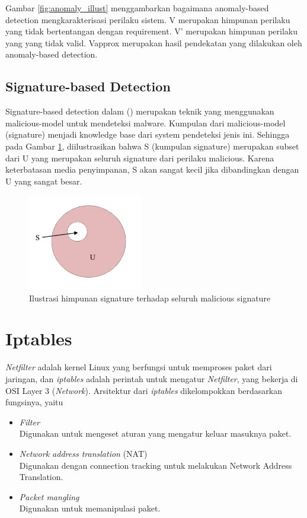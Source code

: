 Gambar \ref{fig:anomaly_illust} menggambarkan bagaimana anomaly-based detection mengkarakterisasi perilaku sistem. V merupakan himpunan perilaku yang tidak bertentangan dengan requirement. V’ merupakan himpunan perilaku yang yang tidak valid. Vapprox merupakan hasil pendekatan yang dilakukan oleh anomaly-based detection.

\subsection{Signature-based Detection}
Signature-based detection dalam (\cite{idika2007survey}) merupakan teknik yang menggunakan malicious-model untuk mendeteksi malware. Kumpulan dari malicious-model (signature) menjadi knowledge base dari system pendeteksi jenis ini. Sehingga pada Gambar \ref{fig:signature_illust}, diilustrasikan bahwa S (kumpulan signature) merupakan subset dari U yang merupakan seluruh signature dari perilaku malicious. Karena keterbatasan media penyimpanan, S akan sangat kecil jika dibandingkan dengan U yang sangat besar.

\begin{figure}[H]
	\centering
	\includegraphics[width=190px]{resources/signature_illustration.png}
	\caption{Ilustrasi himpunan signature terhadap seluruh malicious signature}
	\label{fig:signature_illust}
\end{figure}


\section{Iptables}

\textit{Netfilter} adalah kernel Linux yang berfungsi untuk memproses paket dari jaringan, dan \textit{iptables} adalah perintah untuk mengatur \textit{Netfilter}, yang bekerja di OSI Layer 3 (\textit{Network}). Arsitektur dari \textit{iptables} dikelompokkan berdasarkan fungsinya, yaitu
\begin{itemize}
	\item \textit{Filter}\\
	Digunakan untuk mengeset aturan yang mengatur keluar masuknya paket.
	\item \textit{Network address translation} (NAT)\\
	Digunakan dengan connection tracking untuk melakukan Network Address Translation.
	\item \textit{Packet mangling}\\
	Digunakan untuk memanipulasi paket.	
\end{itemize} 


